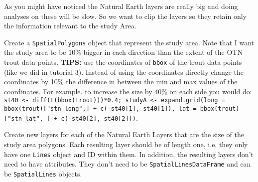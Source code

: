 \documentclass[11pt, oneside]{article}   	%
\begin{document}
\begin{Exercise}

As you might have noticed the Natural Earth layers are really big and doing analyses on these will be slow. So we want to clip the layers so they retain only the information relevant to the study Area.

\Question  Create a \texttt{SpatialPolygons} object that represent the study area. Note that I want the study area to be 10\% bigger in each direction than the extent of the OTN trout data points. \textbf{TIPS:} use the coordinates of \texttt{bbox} of the trout data points (like we did in tutorial 3). Instead of using the coordinates directly change the coordinates by 10\% the difference in between the min and max values of the coordinates. For example. to increase the size by 40\% on each side you would do: \texttt{st40 <- diff(t(bbox(trout)))*0.4; studyA <- expand.grid(long = bbox(trout)["stn\_long",] + c(-st40[1], st40[1]), lat = bbox(trout)["stn\_lat", ] + c(-st40[2], st40[2]))}.

\Question Create new layers for each of the Natural Earth Layers that are the size of the study area polygons. Each resulting layer should be of length one, i.e. they only have one \texttt{Lines} object and ID within them. In addition, the resulting layers don't need to have attributes. They don't need to be \texttt{SpatialLinesDataFrame} and can be \texttt{SpatialLines} objects.

\end{Exercise}
\end{document}
